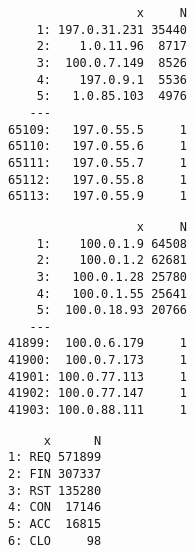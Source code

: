 \documentclass[12pt,twoside]{dukestatscithesis}
\theoremstyle{definition}
\theoremstyle{definition}
\theoremstyle{definition}
\theoremstyle{remark}
\begin{document}
\begin{verbatim}
                  x     N
    1: 197.0.31.231 35440
    2:    1.0.11.96  8717
    3:  100.0.7.149  8526
    4:    197.0.9.1  5536
    5:   1.0.85.103  4976
   ---                   
65109:   197.0.55.5     1
65110:   197.0.55.6     1
65111:   197.0.55.7     1
65112:   197.0.55.8     1
65113:   197.0.55.9     1
\end{verbatim}
\begin{Shaded}
\begin{Highlighting}[]
\end{Highlighting}
\end{Shaded}
\begin{verbatim}
                  x     N
    1:    100.0.1.9 64508
    2:    100.0.1.2 62681
    3:   100.0.1.28 25780
    4:   100.0.1.55 25641
    5:  100.0.18.93 20766
   ---                   
41899:  100.0.6.179     1
41900:  100.0.7.173     1
41901: 100.0.77.113     1
41902: 100.0.77.147     1
41903: 100.0.88.111     1
\end{verbatim}
\begin{Shaded}
\begin{Highlighting}[]
\end{Highlighting}
\end{Shaded}
\begin{verbatim}
     x      N
1: REQ 571899
2: FIN 307337
3: RST 135280
4: CON  17146
5: ACC  16815
6: CLO     98
\end{verbatim}
\end{document}
